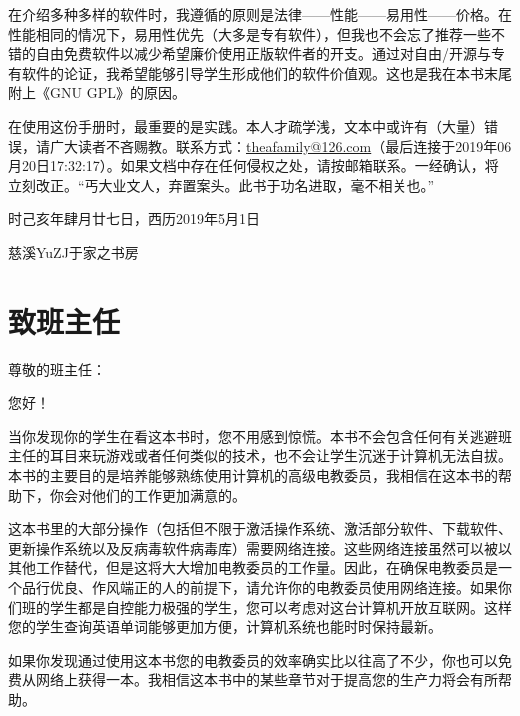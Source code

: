 在介绍多种多样的软件时，我遵循的原则是法律——性能——易用性——价格。在性能相同的情况下，易用性优先（大多是专有软件），但我也不会忘了推荐一些不错的自由免费软件以减少希望廉价使用正版软件者的开支。通过对自由/开源与专有软件的论证，我希望能够引导学生形成他们的软件价值观。这也是我在本书末尾附上《GNU GPL》的原因。\par
 在使用这份手册时，最重要的是实践。本人才疏学浅，文本中或许有（大量）错误，请广大读者不吝赐教。联系方式：\url{theafamily@126.com}（最后连接于2019年06月20日17:32:17）。如果文档中存在任何侵权之处，请按邮箱联系。一经确认，将立刻改正。“丐大业文人，弃置案头。此书于功名进取，毫不相关也。”\par
时己亥年肆月廿七日，西历2019年5月1日\par
慈溪YuZJ于家之书房
\section{致班主任}
\noindent 尊敬的班主任：\par
您好！\par
当你发现你的学生在看这本书时，您不用感到惊慌。本书不会包含任何有关逃避班主任的耳目来玩游戏或者任何类似的技术，也不会让学生沉迷于计算机无法自拔。本书的主要目的是培养能够熟练使用计算机的高级电教委员，我相信在这本书的帮助下，你会对他们的工作更加满意的。\par
这本书里的大部分操作（包括但不限于激活操作系统、激活部分软件、下载软件、更新操作系统以及反病毒软件病毒库）需要网络连接。这些网络连接虽然可以被以其他工作替代，但是这将大大增加电教委员的工作量。因此，在确保电教委员是一个品行优良、作风端正的人的前提下，请允许你的电教委员使用网络连接。如果你们班的学生都是自控能力极强的学生，您可以考虑对这台计算机开放互联网。这样您的学生查询英语单词能够更加方便，计算机系统也能时时保持最新。\par
如果你发现通过使用这本书您的电教委员的效率确实比以往高了不少，你也可以免费从网络上获得一本。我相信这本书中的某些章节对于提高您的生产力将会有所帮助。
